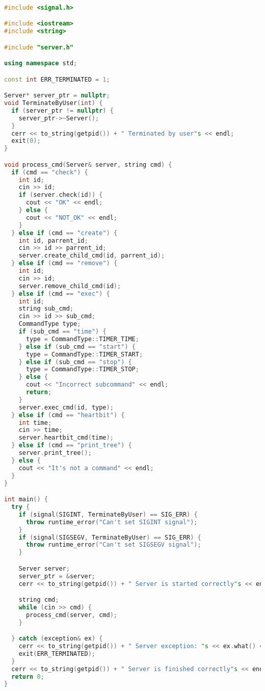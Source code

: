 \begin{lstlisting}[language=C++]

#include <signal.h>

#include <iostream>
#include <string>

#include "server.h"

using namespace std;

const int ERR_TERMINATED = 1;

Server* server_ptr = nullptr;
void TerminateByUser(int) {
  if (server_ptr != nullptr) {
    server_ptr->~Server();
  }
  cerr << to_string(getpid()) + " Terminated by user"s << endl;
  exit(0);
}

void process_cmd(Server& server, string cmd) {
  if (cmd == "check") {
    int id;
    cin >> id;
    if (server.check(id)) {
      cout << "OK" << endl;
    } else {
      cout << "NOT_OK" << endl;
    }
  } else if (cmd == "create") {
    int id, parrent_id;
    cin >> id >> parrent_id;
    server.create_child_cmd(id, parrent_id);
  } else if (cmd == "remove") {
    int id;
    cin >> id;
    server.remove_child_cmd(id);
  } else if (cmd == "exec") {
    int id;
    string sub_cmd;
    cin >> id >> sub_cmd;
    CommandType type;
    if (sub_cmd == "time") {
      type = CommandType::TIMER_TIME;
    } else if (sub_cmd == "start") {
      type = CommandType::TIMER_START;
    } else if (sub_cmd == "stop") {
      type = CommandType::TIMER_STOP;
    } else {
      cout << "Incorrect subcommand" << endl;
      return;
    }
    server.exec_cmd(id, type);
  } else if (cmd == "heartbit") {
    int time;
    cin >> time;
    server.heartbit_cmd(time);
  } else if (cmd == "print_tree") {
    server.print_tree();
  } else {
    cout << "It's not a command" << endl;
  }
}

int main() {
  try {
    if (signal(SIGINT, TerminateByUser) == SIG_ERR) {
      throw runtime_error("Can't set SIGINT signal");
    }
    if (signal(SIGSEGV, TerminateByUser) == SIG_ERR) {
      throw runtime_error("Can't set SIGSEGV signal");
    }

    Server server;
    server_ptr = &server;
    cerr << to_string(getpid()) + " Server is started correctly"s << endl;

    string cmd;
    while (cin >> cmd) {
      process_cmd(server, cmd);
    }

  } catch (exception& ex) {
    cerr << to_string(getpid()) + " Server exception: "s << ex.what() << "\nTerminated by exception" << endl;
    exit(ERR_TERMINATED);
  }
  cerr << to_string(getpid()) + " Server is finished correctly"s << endl;
  return 0;
}


\end{lstlisting}

\pagebreak